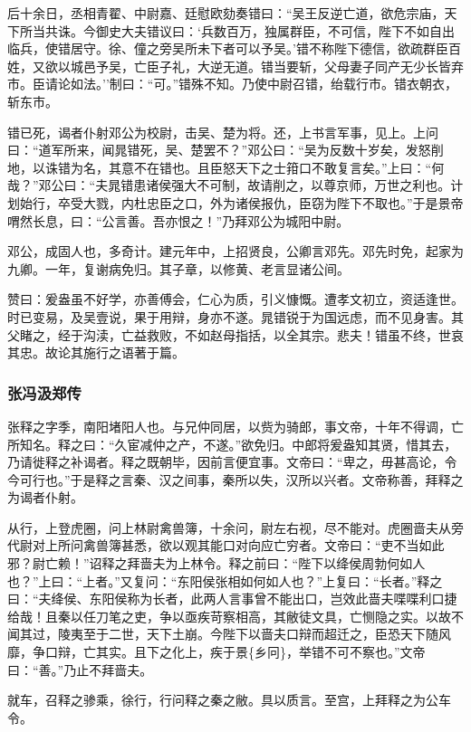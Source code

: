 \documentclass[]{article}
\begin{document}
后十余日，丞相青翟、中尉嘉、廷慰欧劾奏错曰：``吴王反逆亡道，欲危宗庙，天下所当共诛。今御史大夫错议曰：`兵数百万，独属群臣，不可信，陛下不如自出临兵，使错居守。徐、僮之旁吴所未下者可以予吴。'错不称陛下德信，欲疏群臣百姓，又欲以城邑予吴，亡臣子礼，大逆无道。错当要斩，父母妻子同产无少长皆弃市。臣请论如法。''制曰：``可。''错殊不知。乃使中尉召错，绐载行市。错衣朝衣，斩东市。

错已死，谒者仆射邓公为校尉，击吴、楚为将。还，上书言军事，见上。上问曰：``道军所来，闻晁错死，吴、楚罢不？''邓公曰：``吴为反数十岁矣，发怒削地，以诛错为名，其意不在错也。且臣怒天下之士箝口不敢复言矣。''上曰：``何哉？''邓公曰：``夫晁错患诸侯强大不可制，故请削之，以尊京师，万世之利也。计划始行，卒受大戮，内杜忠臣之口，外为诸侯报仇，臣窃为陛下不取也。''于是景帝喟然长息，曰：``公言善。吾亦恨之！''乃拜邓公为城阳中尉。

邓公，成固人也，多奇计。建元年中，上招贤良，公卿言邓先。邓先时免，起家为九卿。一年，复谢病免归。其子章，以修黄、老言显诸公间。

赞曰：爰盎虽不好学，亦善傅会，仁心为质，引义慷慨。遭孝文初立，资适逢世。时已变易，及吴壹说，果于用辩，身亦不遂。晁错锐于为国远虑，而不见身害。其父睹之，经于沟渎，亡益救败，不如赵母指括，以全其宗。悲夫！错虽不终，世哀其忠。故论其施行之语著于篇。

\hypertarget{header-n4190}{%
\subsubsection{张冯汲郑传}\label{header-n4190}}

张释之字季，南阳堵阳人也。与兄仲同居，以赀为骑郎，事文帝，十年不得调，亡所知名。释之曰：``久宦减仲之产，不遂。''欲免归。中郎将爰盎知其贤，惜其去，乃请徙释之补谒者。释之既朝毕，因前言便宜事。文帝曰：``卑之，毋甚高论，令今可行也。''于是释之言秦、汉之间事，秦所以失，汉所以兴者。文帝称善，拜释之为谒者仆射。

从行，上登虎圈，问上林尉禽兽簿，十余问，尉左右视，尽不能对。虎圈啬夫从旁代尉对上所问禽兽簿甚悉，欲以观其能口对向应亡穷者。文帝曰：``吏不当如此邪？尉亡赖！''诏释之拜啬夫为上林令。释之前曰：``陛下以绛侯周勃何如人也？''上曰：``上者。''又复问：``东阳侯张相如何如人也？''上复曰：``长者。''释之曰：``夫绛侯、东阳侯称为长者，此两人言事曾不能出口，岂效此啬夫喋喋利口捷给哉！且秦以任刀笔之吏，争以亟疾苛察相高，其敝徒文具，亡恻隐之实。以故不闻其过，陵夷至于二世，天下土崩。今陛下以啬夫口辩而超迁之，臣恐天下随风靡，争口辩，亡其实。且下之化上，疾于景\{乡冋\}，举错不可不察也。''文帝曰：``善。''乃止不拜啬夫。

就车，召释之骖乘，徐行，行问释之秦之敝。具以质言。至宫，上拜释之为公车令。
\end{document}
